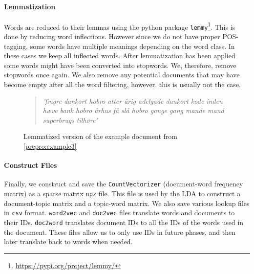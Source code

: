 \paragraph{Lemmatization}
Words are reduced to their lemmas using the python package \texttt{lemmy}\footnote{\url{https://pypi.org/project/lemmy/}}. 
This is done by reducing word inflections.
However since we do not have proper POS-tagging, some words have multiple meanings depending on the word class.
In these cases we keep all inflected words.
After lemmatization has been applied some words might have been converted into stopwords.
We, therefore, remove stopwords once again.
We also remove any potential documents that may have become empty after all the word filtering, however, this is usually not the case.
\begin{figure}[h]
	\begin{quote}
		\textit{
			'fingre dankort hobro atter årig adelgade dankort kode inden hæve bank hobro århus få slå hobro gange gang mande mand superbrugs tilhøre'
		}
	\end{quote}
	\caption{Lemmatized version of the example document from \autoref{prepro:example3}}
	\label{prepro:example5}
\end{figure}

\paragraph{Construct Files}
Finally, we construct and save the \texttt{CountVectorizer} (document-word frequency matrix) as a sparse matrix \texttt{npz} file.
This file is used by the LDA to construct a document-topic matrix and a topic-word matrix.
We also save various lookup files in \texttt{csv} format.
\texttt{word2vec} and \texttt{doc2vec} files translate words and documents to their IDs.
\texttt{doc2word} translates document IDs to all the IDs of the words used in the document.
These files allow us to only use IDs in future phases, and then later translate back to words when needed.


